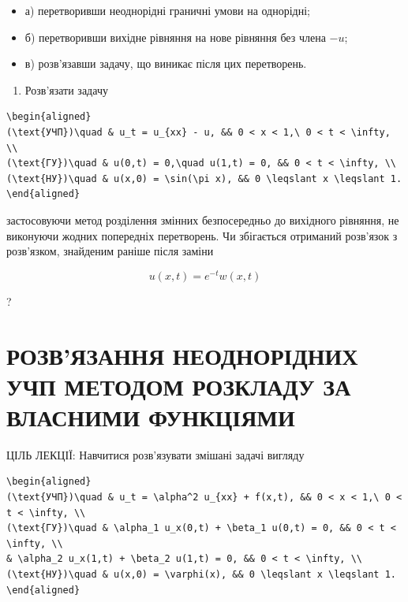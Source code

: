 \documentclass[
  ukrainian,
]{article}
\providecommand{\tightlist}{%
  \setlength{\itemsep}{0pt}\setlength{\parskip}{0pt}}
\begin{document}
\begin{itemize}
\tightlist
\item
  а) перетворивши неоднорідні граничні умови на однорідні;
\item
  б) перетворивши вихідне рівняння на нове рівняння без члена \(-u\);
\item
  в) розв'язавши задачу, що виникає після цих перетворень.
\end{itemize}

\begin{enumerate}
\def\labelenumi{\arabic{enumi}.}
\setcounter{enumi}{2}
\tightlist
\item
  Розв'язати задачу
\end{enumerate}

\begin{verbatim}
\begin{aligned}
(\text{УЧП})\quad & u_t = u_{xx} - u, && 0 < x < 1,\ 0 < t < \infty, \\
(\text{ГУ})\quad & u(0,t) = 0,\quad u(1,t) = 0, && 0 < t < \infty, \\
(\text{НУ})\quad & u(x,0) = \sin(\pi x), && 0 \leqslant x \leqslant 1.
\end{aligned}
\end{verbatim}

застосовуючи метод розділення змінних безпосередньо до вихідного
рівняння, не виконуючи жодних попередніх перетворень. Чи збігається
отриманий розв'язок з розв'язком, знайденим раніше після заміни

\[
u(x,t) = e^{-t}w(x,t)
\]

?

\section{РОЗВ'ЯЗАННЯ НЕОДНОРІДНИХ УЧП МЕТОДОМ РОЗКЛАДУ ЗА ВЛАСНИМИ
ФУНКЦІЯМИ}\label{ux440ux43eux437ux432ux44fux437ux430ux43dux43dux44f-ux43dux435ux43eux434ux43dux43eux440ux456ux434ux43dux438ux445-ux443ux447ux43f-ux43cux435ux442ux43eux434ux43eux43c-ux440ux43eux437ux43aux43bux430ux434ux443-ux437ux430-ux432ux43bux430ux441ux43dux438ux43cux438-ux444ux443ux43dux43aux446ux456ux44fux43cux438}

ЦІЛЬ ЛЕКЦІЇ: Навчитися розв'язувати змішані задачі вигляду

\begin{verbatim}
\begin{aligned}
(\text{УЧП})\quad & u_t = \alpha^2 u_{xx} + f(x,t), && 0 < x < 1,\ 0 < t < \infty, \\
(\text{ГУ})\quad & \alpha_1 u_x(0,t) + \beta_1 u(0,t) = 0, && 0 < t < \infty, \\
& \alpha_2 u_x(1,t) + \beta_2 u(1,t) = 0, && 0 < t < \infty, \\
(\text{НУ})\quad & u(x,0) = \varphi(x), && 0 \leqslant x \leqslant 1.
\end{aligned}
\end{verbatim}
\end{document}
